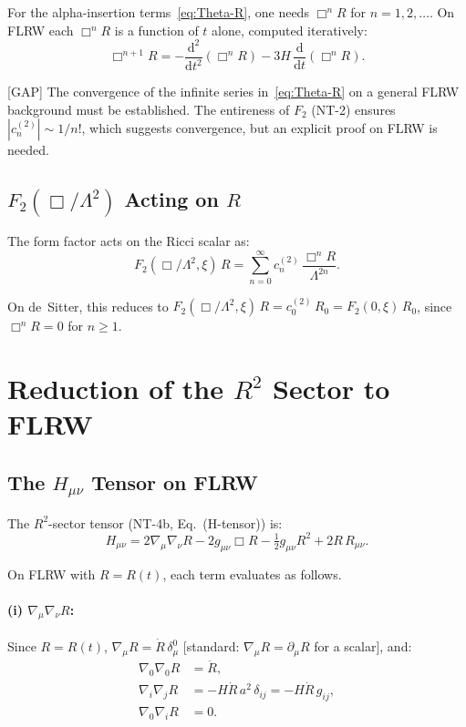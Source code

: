 \documentclass[12pt,a4paper]{article}
\theoremstyle{definition}
\theoremstyle{remark}
\newcommand{\dd}{\mathrm{d}}
\newcommand{\fromlit}[1]{\textcolor{blue!70!black}{\textsf{[#1]}}}
\newcommand{\gap}{\textcolor{red!80!black}{\textsf{[GAP]}}}
\begin{document}
For the alpha-insertion terms~\eqref{eq:Theta-R}, one needs
$\Box^n R$ for $n = 1, 2, \ldots$. On FLRW each $\Box^n R$ is a
function of $t$ alone, computed iteratively:
\begin{equation}\label{eq:boxnR-iter}
  \Box^{n+1} R = -\frac{\dd^2}{\dd t^2}(\Box^n R)
  - 3H\,\frac{\dd}{\dd t}(\Box^n R).
\end{equation}

\gap{} The convergence of the infinite series in~\eqref{eq:Theta-R}
on a general FLRW background must be established. The entireness of
$F_2$ (NT-2) ensures $|c_n^{(2)}| \sim 1/n!$, which suggests
convergence, but an explicit proof on FLRW is needed.

\subsection{$F_2(\Box/\Lambda^2)$ Acting on $R$}

The form factor acts on the Ricci scalar as:
\begin{equation}\label{eq:F2-action-R}
  F_2(\Box/\Lambda^2,\xi)\,R = \sum_{n=0}^{\infty}
  c_n^{(2)}\,\frac{\Box^n R}{\Lambda^{2n}}.
\end{equation}

On de~Sitter, this reduces to
$F_2(\Box/\Lambda^2,\xi)\,R = c_0^{(2)}\,R_0 = F_2(0,\xi)\,R_0$,
since $\Box^n R = 0$ for $n \geq 1$.

\section{Reduction of the $R^2$ Sector to FLRW}\label{sec:r2-flrw}

\subsection{The $H_{\mu\nu}$ Tensor on FLRW}

The $R^2$-sector tensor (NT-4b, Eq.~(H-tensor)) is:
\begin{equation}\label{eq:H-def}
  H_{\mu\nu} = 2\nabla_\mu\nabla_\nu R
  - 2g_{\mu\nu}\Box R
  - \tfrac{1}{2}g_{\mu\nu}R^2
  + 2R\,R_{\mu\nu}.
\end{equation}

On FLRW with $R = R(t)$, each term evaluates as follows.

\paragraph{(i) $\nabla_\mu\nabla_\nu R$:}
Since $R = R(t)$, $\nabla_\mu R = \dot{R}\,\delta^0_\mu$
\fromlit{standard: $\nabla_\mu R = \partial_\mu R$ for a scalar},
and:
\begin{align}
  \nabla_0\nabla_0 R &= \ddot{R},
  \label{eq:nnR-00}\\
  \nabla_i\nabla_j R &= -H\dot{R}\,a^2\,\delta_{ij}
  = -H\dot{R}\,g_{ij},
  \label{eq:nnR-ij}\\
  \nabla_0\nabla_i R &= 0.
  \label{eq:nnR-0i}
\end{align}
\end{document}
